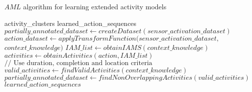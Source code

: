 \begin{algorithm}
 \caption{$AML$ algorithm for learning extended activity models}
 \label{alg:aml}
 \begin{algorithmic}
 \REQUIRE activity\_clusters
 \ENSURE learned\_action\_sequences
 \STATE $partially\_annotated\_dataset \leftarrow createDataset(sensor\_activation\_dataset)$
 \STATE $action\_dataset \leftarrow applyTransformFunction(sensor\_activation\_dataset,$ 
 $context\_knowledge)$
 \STATE $IAM\_list \leftarrow obtainIAMS(context\_knowledge)$
    \STATE $activities \leftarrow obtainActivities(action, IAM\_list)$
  \ENDIF
    \STATE $// \text{ Use duration, completion and location criteria}$
    \STATE $valid\_activities \leftarrow findValidActivities(context\_knowledge)$
  \ENDFOR
 \ENDFOR
 \STATE $partially\_annotated\_dataset \leftarrow findNonOverlappingActivities(valid\_activities)$
 \RETURN $learned\_action\_sequences$
 \end{algorithmic}
\end{algorithm}